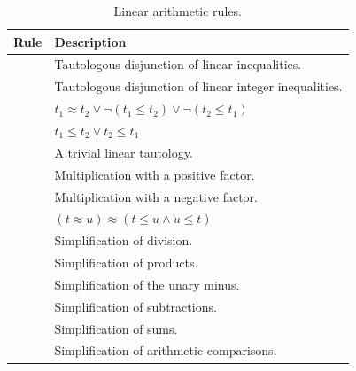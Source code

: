 \begin{xltabular}{\linewidth}{l X}
\caption{Linear arithmetic rules.}
\label{rule-tab:la-tauts}\\
  Rule & Description \\
  \hline
{} & Tautologous disjunction of linear inequalities. \\
 & Tautologous disjunction of linear integer inequalities. \\
 & $t_1 ≈ t_2 \lor \neg (t_1 \leq t_2) \lor \neg (t_2 \leq t_1)$ \\
 & $t_1 \leq t_2 \lor t_2 \leq t_1$ \\
 & A trivial linear tautology. \\
 & Multiplication with a positive factor. \\
 & Multiplication with a negative factor.\\
 & $(t ≈ u) ≈ (t \leq u \land u \leq t)$ \\
 & Simplification of division. \\
 & Simplification of products. \\
 & Simplification of the unary minus. \\
 & Simplification of subtractions. \\
 & Simplification of sums. \\
 & Simplification of arithmetic comparisons. \\
\end{xltabular}

